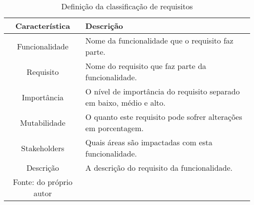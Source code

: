       \begin{table}[h!]
        \centering
        \label{Tabela:4}
        \caption{Definição da classificação de requisitos}
        \begin{tabular}{c p{9cm}}
          \hline
          \textbf{Característica} &
          \textbf{Descrição} \\
          \hline
          Funcionalidade &
          Nome da funcionalidade que o requisito faz parte. \\
          Requisito &
          Nome do requisito que faz parte da funcionalidade. \\
          Importância &
          O nível de importância do requisito separado em baixo, médio e alto. \\
          Mutabilidade &
          O quanto este requisito pode sofrer alterações em porcentagem. \\
          Stakeholders &
          Quais áreas são impactadas com esta funcionalidade. \\
          Descrição &
          A descrição do requisito da funcionalidade. \\ \hline
          \newline
          \small{Fonte: do próprio autor}
        \end{tabular}
      \end{table}

